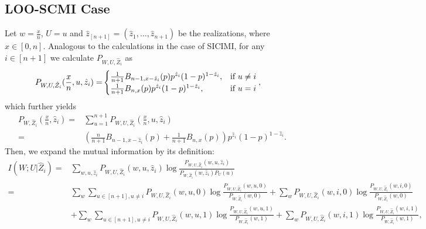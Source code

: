 \documentclass[onecolumn,romanappendices,10pt]{IEEEtran}
\begin{document}
	\subsection{LOO-SCMI Case} \label{subapp:cal_LOO_SCMI}
	Let $w = \frac{x}{n}$, $U = u$ and $\hat{z}_{[n+1]} = (\hat{z}_1, \ldots, \hat{z}_{n+1})$ be the realizations, where $x \in [0, n]$. Analogous to the calculations in the case of SICIMI, for any $i \in [n+1]$ we calculate $P_{W, U, \hat{Z}_{i}}$ as
	\begin{equation}
		\begin{aligned}
			P_{W, U, \hat{Z}_{i}}(\frac{x}{n}, u, \hat{z}_{i}) =& \begin{cases}
				\frac{1}{n+1} B_{n-1,x-\hat{z}_{i}}(p) p^{\hat{z}_{i}} (1-p)^{1-\hat{z}_{i}}, & \textnormal{if $u \not= i$} \\
				\frac{1}{n+1} B_{n,x}(p) p^{\hat{z}_{i}} (1-p)^{1-\hat{z}_{i}}, & \textnormal{if $u = i$}
			\end{cases},
		\end{aligned}
	\end{equation}
	which further yields
	\begin{equation}
		\begin{aligned}
			P_{W, \hat{Z}_{i}}(\frac{x}{n}, \hat{z}_{i}) =& \sum_{u=1}^{n+1} P_{W, U, \hat{Z}_{i}}(\frac{x}{n}, u, \hat{z}_{i}) \\
			=& \left( \frac{n}{n+1} B_{n-1,x-\hat{z}_{i}}(p) + \frac{1}{n+1} B_{n,x}(p) \right) p^{\hat{z}_{i}} (1-p)^{1-\hat{z}_{i}}.
		\end{aligned}
	\end{equation}
	Then, we expand the mutual information by its definition:
	\begin{equation}
		\begin{aligned}
			I\left( W; U | \hat{Z}_{i} \right) =& \sum_{w, u, \hat{z}_{i}} P_{W, U, \hat{Z}_{i}}(w, u, \hat{z}_{i}) \log \frac{P_{W, U, \hat{Z}_{i}}(w, u, \hat{z}_{i})}{P_{W, \hat{Z}_{i}}(w, \hat{z}_{i}) P_{U}(u)} \\
			=& \sum_{w} \sum_{u \in [n+1], u \not= i} P_{W, U, \hat{Z}_{i}}(w, u, 0) \log \frac{P_{W, U, \hat{Z}_{i}}(w, u, 0)}{P_{W, \hat{Z}_{i}}(w, 0)} + \sum_{w} P_{W, U, \hat{Z}_{i}}(w, i, 0) \log \frac{P_{W, U, \hat{Z}_{i}}(w, i, 0)}{P_{W, \hat{Z}_{i}}(w, 0)} \\
			& + \sum_{w} \sum_{u \in [n+1], u \not= i} P_{W, U, \hat{Z}_{i}}(w, u, 1) \log \frac{P_{W, U, \hat{Z}_{i}}(w, u, 1)}{P_{W, \hat{Z}_{i}}(w, 1)} + \sum_{w} P_{W, U, \hat{Z}_{i}}(w, i, 1) \log \frac{P_{W, U, \hat{Z}_{i}}(w, i, 1)}{P_{W, \hat{Z}_{i}}(w, 1)},
		\end{aligned}
	\end{equation}
\end{document}
